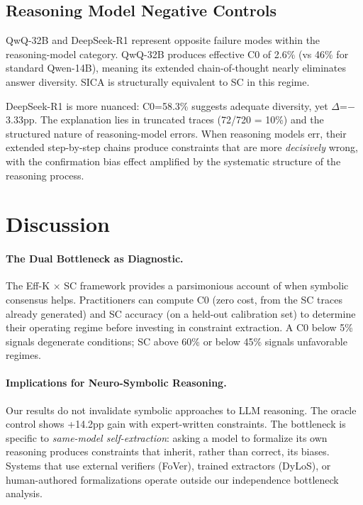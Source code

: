 \documentclass[11pt,a4paper]{article}
\begin{document}
\subsection{Reasoning Model Negative Controls}

QwQ-32B and DeepSeek-R1 represent opposite failure modes within the reasoning-model category. QwQ-32B produces effective C0 of 2.6\% (vs 46\% for standard Qwen-14B), meaning its extended chain-of-thought nearly eliminates answer diversity. SICA is structurally equivalent to SC in this regime.

DeepSeek-R1 is more nuanced: C0=58.3\% suggests adequate diversity, yet $\Delta$=$-$3.33pp. The explanation lies in truncated traces (72/720 = 10\%) and the structured nature of reasoning-model errors. When reasoning models err, their extended step-by-step chains produce constraints that are more \emph{decisively} wrong, with the confirmation bias effect amplified by the systematic structure of the reasoning process.

\section{Discussion}

\paragraph{The Dual Bottleneck as Diagnostic.} The Eff-K $\times$ SC framework provides a parsimonious account of when symbolic consensus helps. Practitioners can compute C0 (zero cost, from the SC traces already generated) and SC accuracy (on a held-out calibration set) to determine their operating regime before investing in constraint extraction. A C0 below 5\% signals degenerate conditions; SC above 60\% or below 45\% signals unfavorable regimes.

\paragraph{Implications for Neuro-Symbolic Reasoning.} Our results do not invalidate symbolic approaches to LLM reasoning. The oracle control shows +14.2pp gain with expert-written constraints. The bottleneck is specific to \emph{same-model self-extraction}: asking a model to formalize its own reasoning produces constraints that inherit, rather than correct, its biases. Systems that use external verifiers (FoVer), trained extractors (DyLoS), or human-authored formalizations operate outside our independence bottleneck analysis.
\end{document}
